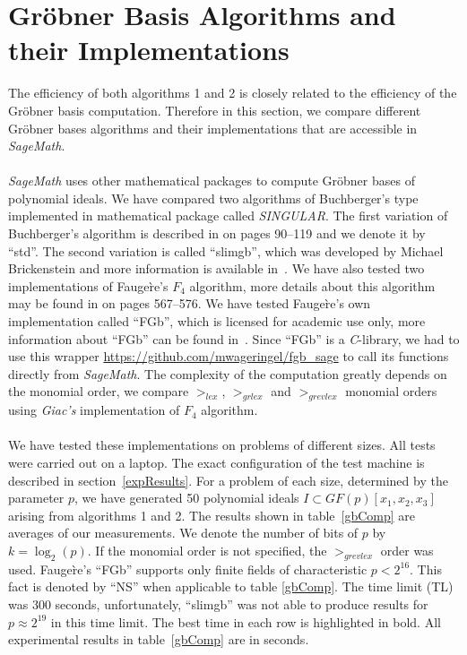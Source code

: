 \documentclass[thesis=M,english]{FITthesis}[2012/10/20]
\theoremstyle{remark}
\theoremstyle{definition}
\begin{document}
\section{Gröbner Basis Algorithms and their Implementations}
The efficiency of both algorithms 1 and 2 is closely related to the efficiency of the Gröbner basis computation. Therefore in this section, we compare different Gröbner bases algorithms and their implementations that are accessible in \textit{SageMath}. \\\\
\noindent \textit{SageMath} uses other mathematical packages to compute Gröbner bases of polynomial ideals. We have compared two algorithms of Buchberger's type implemented in mathematical package called \textit{SINGULAR}. The first variation of Buchberger's algorithm is described in \cite{algGeom} on pages 90--119 and we denote it by \enquote{std}. The second variation is called \enquote{slimgb}, which was developed by Michael Brickenstein and more information is available in~\cite{brick}. We have also tested two implementations of Fauge\`re's $F_4$ algorithm, more details about this algorithm may be found in \cite{algGeom} on pages 567--576. We have tested Fauge\`re's own implementation called \enquote{FGb}, which is licensed for academic use only, more information about \enquote{FGb} can be found in~\cite{fgb}. Since \enquote{FGb} is a \textit{C}-library, we had to use this wrapper \url{https://github.com/mwageringel/fgb_sage} to call its functions directly from \textit{SageMath}. The complexity of the computation greatly depends on the monomial order, we compare $>_{lex}$, $>_{grlex}$ and $>_{grevlex}$ monomial orders using \textit{Giac's} implementation of $F_4$ algorithm.
\\ \\
\noindent We have tested these implementations on problems of different sizes. All tests were carried out on a laptop. The exact configuration of the test machine is described in section~\ref{expResults}. For a problem of each size, determined by the parameter $p$, we have generated 50 polynomial ideals $I \subset GF(p)[x_1,x_2,x_3]$ arising from algorithms 1 and 2. The results shown in table~\ref{gbComp} are averages of our measurements. We denote the number of bits of $p$ by $k =\log_2(p)$. If the monomial order is not specified, the $>_{grevlex}$ order was used. Fauge\`re's \enquote{FGb} supports only finite fields of characteristic $p < 2^{16}$. This fact is denoted by \enquote{NS} when applicable to table \ref{gbComp}. The time limit (TL) was 300 seconds, unfortunately, \enquote{slimgb} was not able to produce results for $p \approx 2^{19}$ in this time limit. The best time in each row is highlighted in bold. All experimental results in table~\ref{gbComp} are in seconds. 
\end{document}
